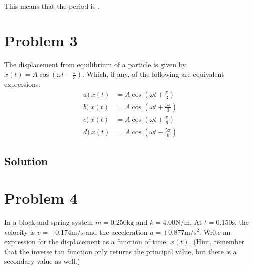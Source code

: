 \documentclass[12pt]{article}
\begin{document}
This means that the period is .
\pagebreak
\section{Problem 3}
The displacement from equilibrium of a particle is given by \(x(t) = A \cos\left(\omega t - \frac{\pi}{3}\right)\). Which, if any, of the following are equivalent expressions:
\begin{align}
    a)\ x(t)    &=  A\cos\left(\omega t + \frac{\pi}{3}\right)\\
    b)\ x(t)    &=  A\cos\left(\omega t + \frac{5\pi}{3}\right)\\
    c)\ x(t)    &=  A\cos\left(\omega t + \frac{\pi}{6}\right)\\
    d)\ x(t)    &=  A\cos\left(\omega t - \frac{5\pi}{6}\right)
\end{align}

\subsection{Solution}

\pagebreak
\section{Problem 4}
In a block and spring system $m = 0.250 \unit{\kilo\gram}$ and $k = 4.00 \unit{\newton/\meter}$. At $t = 0.150 \unit{\second}$, the velocity is $v = -0.174 \unit{\meter/\second}$ and the acceleration $a = +0.877 \unit{\meter/\second^2}$. Write an expression for the displacement as a function of time, $x(t)$. (Hint, remember that the inverse tan function only returns the principal value, but there is a secondary value as well.)
\end{document}
